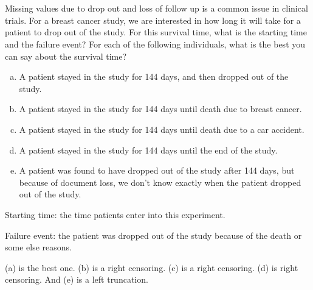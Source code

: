 \documentclass[12pt]{elegantbook}
\begin{document}

\chapter{}

    \begin{exercise}
        Missing values due to drop out and loss of follow up is a common issue in clinical trials. For a breast cancer study, we are interested in how long it will take for a patient to drop out of the study. For this survival time, what is the starting time and the failure event? For each of the following individuals, what is the best you can say about the survival time?
        \begin{enumerate}[(a)]
            \item A patient stayed in the study for 144 days, and then dropped out of the study.
            \item A patient stayed in the study for 144 days until death due to breast cancer.
            \item A patient stayed in the study for 144 days until death due to a car accident.
            \item A patient stayed in the study for 144 days until the end of the study.
            \item A patient was found to have dropped out of the study after 144 days, but because of document loss, we don't know exactly when the patient dropped out of the study. 
        \end{enumerate}
    \end{exercise}

    \begin{solution}

        Starting time: the time patients enter into this experiment. 

        Failure event: the patient was dropped out of the study because of the death or some else reasons. 

        (a) is the best one. (b) is a right censoring. (c) is a right censoring. (d) is right censoring. And (e) is a left truncation. 
    \end{solution}
\end{document}
